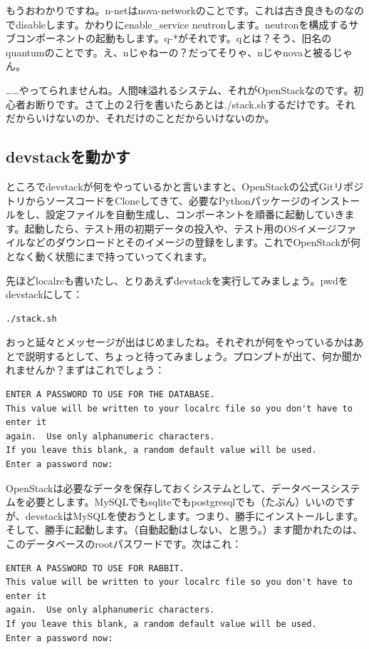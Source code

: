 \documentclass[9pt,b5paper,tombo,openany,dvipdfmx]{jsbook}
\begin{document}
もうおわかりですね。n-netはnova-networkのことです。これは古き良きものなのでdisableします。かわりにenable\_service neutronします。neutronを構成するサブコンポーネントの起動もします。q-*がそれです。qとは？そう、旧名のquantumのことです。え、nじゃねーの？だってそりゃ、nじゃnovaと被るじゃん。

……やってられませんね。人間味溢れるシステム、それがOpenStackなのです。初心者お断りです。さて上の２行を書いたらあとは./stack.shするだけです。それだからいけないのか、それだけのことだからいけないのか。

\subsection{devstackを動かす}

ところでdevstackが何をやっているかと言いますと、OpenStackの公式GitリポジトリからソースコードをCloneしてきて、必要なPythonパッケージのインストールをし、設定ファイルを自動生成し、コンポーネントを順番に起動していきます。起動したら、テスト用の初期データの投入や、テスト用のOSイメージファイルなどのダウンロードとそのイメージの登録をします。これでOpenStackが何となく動く状態にまで持っていってくれます。

先ほどlocalrcも書いたし、とりあえずdevstackを実行してみましょう。pwdをdevstackにして：

\begin{lstlisting}
./stack.sh
\end{lstlisting}

おっと延々とメッセージが出はじめましたね。それぞれが何をやっているかはあとで説明するとして、ちょっと待ってみましょう。プロンプトが出て、何か聞かれませんか？まずはこれでしょう：

\begin{lstlisting}
ENTER A PASSWORD TO USE FOR THE DATABASE.
This value will be written to your localrc file so you don't have to enter it
again.  Use only alphanumeric characters.
If you leave this blank, a random default value will be used.
Enter a password now:
\end{lstlisting}

OpenStackは必要なデータを保存しておくシステムとして、データベースシステムを必要とします。MySQLでもsqliteでもpostgresqlでも（たぶん）いいのですが、devstackはMySQLを使おうとします。つまり、勝手にインストールします。そして、勝手に起動します。（自動起動はしない、と思う。）ます聞かれたのは、このデータベースのrootパスワードです。次はこれ：

\begin{lstlisting}
ENTER A PASSWORD TO USE FOR RABBIT.
This value will be written to your localrc file so you don't have to enter it
again.  Use only alphanumeric characters.
If you leave this blank, a random default value will be used.
Enter a password now:
\end{lstlisting}
\end{document}
